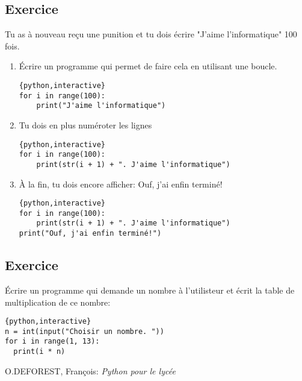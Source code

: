 \documentclass[a4paper,11pt]{article}
\begin{document}
\subsection{Exercice}
Tu as à nouveau reçu une punition et tu dois écrire "J'aime l'informatique" 100 fois.
\begin{enumerate}
\item Écrire un programme qui permet de faire cela en utilisant une boucle.
\begin{solution}
\begin{verbatim}{python,interactive}
for i in range(100):
    print("J'aime l'informatique")
\end{verbatim}
\end{solution}
\item Tu dois en plus numéroter les lignes
\begin{solution}
\begin{verbatim}{python,interactive}
for i in range(100):
    print(str(i + 1) + ". J'aime l'informatique")
\end{verbatim}
\end{solution}
\item À la fin, tu dois encore afficher: Ouf, j'ai enfin terminé!
\begin{solution}
\begin{verbatim}{python,interactive}
for i in range(100):
    print(str(i + 1) + ". J'aime l'informatique")
print("Ouf, j'ai enfin terminé!")
\end{verbatim}
\end{solution}
\end{enumerate}

\subsection{Exercice}
Écrire un programme qui demande un nombre à l'utilisteur et écrit la table de multiplication de ce nombre:\\
\begin{solution}
\begin{verbatim}{python,interactive}
n = int(input("Choisir un nombre. "))
for i in range(1, 13):
  print(i * n)
\end{verbatim}
\end{solution}

\vfill
\renewcommand{\refname}{Références}
\begin{thebibliography}{9}
 O.DEFOREST, François: \emph{Python pour le lycée}
\end{thebibliography}
\end{document}
